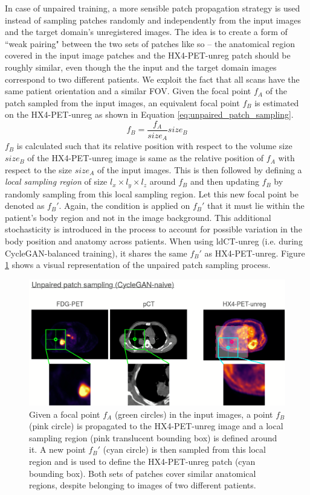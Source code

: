 In case of unpaired training, a more sensible patch propagation strategy is used instead of sampling patches randomly and independently from the input images and the target domain's unregistered images. The idea is to create a form of ``weak pairing" between the two sets of patches like so -- the anatomical region covered in the input image patches and the HX4-PET-unreg patch should be roughly similar, even though the the input and the target domain images correspond to two different patients. We exploit the fact that all scans have the same patient orientation and a similar FOV. Given the focal point $f_A$ of the patch sampled from the input images, an equivalent focal point $f_B$ is estimated on the HX4-PET-unreg as shown in Equation \ref{eq:unpaired_patch_sampling}.
\begin{equation}
    f_B = \frac{f_A}{size_A} size_B
    \label{eq:unpaired_patch_sampling}
\end{equation}
$f_B$ is calculated such that its relative position with respect to the volume size $size_B$ of the HX4-PET-unreg image is same as the relative position of $f_A$ with respect to the size $size_A$ of the input images. This is then followed by defining a \textit{local sampling region} of size $l_x \times l_y \times l_z$ around $f_B$ and then updating $f_B$ by randomly sampling from this local sampling region. Let this new focal point be denoted as $f_B'$. Again, the condition is applied on $f_B'$ that it must lie within the patient's body region and not in the image background. This additional stochasticity is introduced in the process to account for possible variation in the body position and anatomy across patients. When using ldCT-unreg (i.e. during CycleGAN-balanced training), it shares the same $f_B'$ as HX4-PET-unreg. Figure \ref{fig:unpaired_patch_sampling} shows a visual representation of the unpaired patch sampling process.

\begin{figure}[h!]
    \centering
    \includegraphics[width=\linewidth]{figures/Data/patch_sampling/unpaired_patch_sampling.png}
    \caption{Given a focal point $f_A$ (green circles) in the input images, a point $f_B$ (pink circle) is propagated to the HX4-PET-unreg image and a local sampling region (pink translucent bounding box) is defined around it. A new point $f_B'$ (cyan circle) is then sampled from this local region and is used to define the HX4-PET-unreg patch (cyan bounding box). Both sets of patches cover similar anatomical regions, despite belonging to images of two different patients.}
    \label{fig:unpaired_patch_sampling}
\end{figure}

